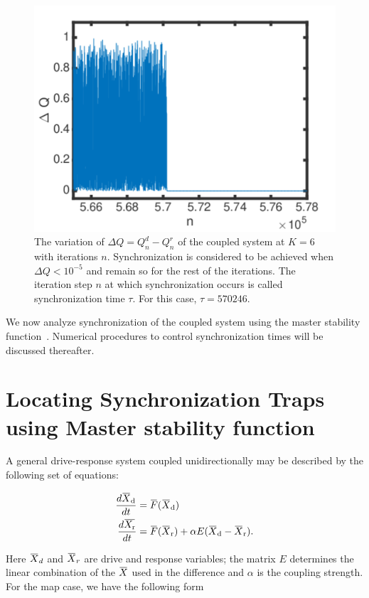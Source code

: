 \documentclass[reprint,amsmath,amssymb,aps,pre]{revtex4-1}
\newcommand{\overbar}[1]{\mkern 1.5mu\overline{\mkern-1.5mu#1\mkern-1.5mu}\mkern 1.5mu}
\begin{document}
\begin{figure}[b]
	\includegraphics[scale=.4]{Sync_exmaple}
	\caption{\label{fig:sync_ex} \footnotesize The variation of $\Delta Q = Q^d_n-Q^r_n$ of the coupled system at $K = 6$ with iterations $n$. Synchronization is considered to be achieved when $\Delta Q < 10^{-5}$ and remain so for the rest of the iterations. The iteration step $n$ at which synchronization occurs is called synchronization time $\tau$. For this case, $\tau = 570 246.$ }
\end{figure}

We now analyze synchronization of the coupled system using the master stability function~\cite{Pecora1998}. Numerical procedures to control synchronization times will be discussed thereafter.  

\section{Locating Synchronization Traps using Master stability function}
\label{Master stability function}
A general drive-response system coupled unidirectionally may be described by the following set of equations:

\begin{align}
\frac{d\overbar{X}_\textnormal{d}}{dt} & = \overbar{F}(\overbar{X}_\textnormal{d}) \nonumber  \\
\frac{d\overbar{X_\textnormal{r}}}{dt} &= \overbar{F}(\overbar{X}_\textnormal{r}) + \alpha 
E(\overbar{X}_\textnormal{d}-\overbar{X}_\textnormal{r}).
\end{align}

\noindent Here $\overbar{X}_d$ and $\overbar{X}_r$ are drive and response 
variables; the matrix $E$ determines the linear combination of the 
$\overbar{X}$ used in the difference and $\alpha$ is the coupling strength. 
For the map case, we have the following form
\end{document}
